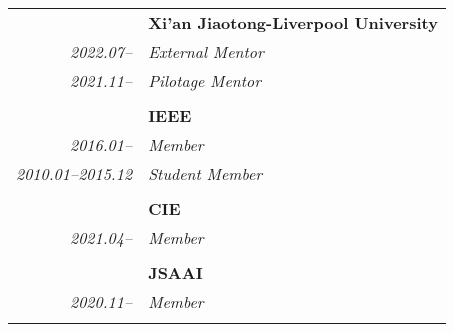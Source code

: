 \documentclass[paper=a4,fontsize=11pt]{scrartcl}
\begin{document}
~\\
\begin{tabular}{r|p{11cm}}
	
	~ & \textbf{Xi'an Jiaotong-Liverpool University}\\
	\emph{2022.07--} & \emph{External Mentor}\\
	\emph{2021.11--} & \emph{Pilotage Mentor}\\
	\multicolumn{2}{c}{} \\
	
	
	
	~ & \textbf{IEEE}\\
	\emph{2016.01--} & \emph{Member}\\
	\emph{2010.01--2015.12} & \emph{Student Member}\\
	\multicolumn{2}{c}{} \\
	
	
	~ & \textbf{CIE} \\
	\emph{2021.04--} & \emph{Member}\\
	\multicolumn{2}{c}{} \\
	
	
	~ & \textbf{JSAAI} \\
	\emph{2020.11--} & \emph{Member}\\
	\multicolumn{2}{c}{}
	
	
\end{tabular}

~\\
\end{document}

